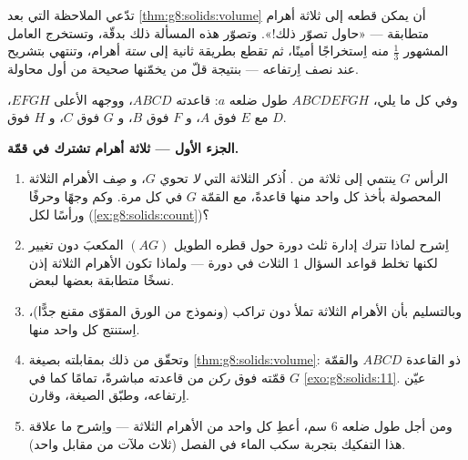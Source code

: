 \begin{problem}
\label{pb:g8:solids:1}
تدّعي الملاحظة التي بعد \cref{thm:g8:solids:volume} أن 
يمكن قطعه إلى ثلاثة أهرام متطابقة --- «حاول تصوّر
ذلك!». وتصوّر هذه المسألة ذلك بدقّة، وتستخرج العامل المشهور
$\frac13$ منه اِستخراجًا أمينًا، ثم تقطع  بطريقة ثانية إلى
\emph{ستة} أهرام، وتنتهي بتشريح  عند نصف
اِرتفاعه --- بنتيجة قلّ من يخمّنها صحيحة من أول محاولة.

وفي كل ما يلي، $ABCDEFGH$  طول ضلعه $a$: قاعدته $ABCD$، ووجهه
الأعلى $EFGH$، مع $E$ فوق $A$، و $F$ فوق $B$، و $G$ فوق $C$، و
$H$ فوق $D$.

\medskip
\noindent\textbf{الجزء الأول --- ثلاثة أهرام تشترك في قمّة.}
\begin{enumerate}
  \item الرأس $G$ ينتمي إلى ثلاثة  من . اُذكر
         الثلاثة التي \emph{لا} تحوي $G$، و
        صِف الأهرام الثلاثة المحصولة بأخذ كل واحد
        منها قاعدةً، مع القمّة $G$ في كل مرة. وكم وجهًا
        وحرفًا ورأسًا لكل 
        (\cref{ex:g8:solids:count})؟
  \item اِشرح لماذا تترك إدارة  ثلث دورة حول
        قطره الطويل $(AG)$ المكعبَ دون تغيير لكنها
        تخلط قواعد السؤال 1 الثلاث في دورة ---
        ولماذا تكون الأهرام الثلاثة إذن نسخًا
        متطابقة بعضها لبعض.
  \item وبالتسليم بأن الأهرام الثلاثة تملأ  دون
        تراكب (ونموذج من الورق المقوّى مقنع جدًّا)،
        اِستنتج  كل واحد منها.
  \item وتحقّق من ذلك بمقابلته بصيغة
        \cref{thm:g8:solids:volume}:  ذو القاعدة $ABCD$
        والقمّة $G$ قمّته فوق \emph{ركن}
        من قاعدته مباشرةً، تمامًا كما في \cref{exo:g8:solids:11}.
        عيّن اِرتفاعه، وطبّق الصيغة، وقارن.
  \item ومن أجل  طول ضلعه $6$ سم، أعطِ  كل واحد من
        الأهرام الثلاثة --- واِشرح ما علاقة هذا التفكيك
        بتجربة سكب الماء في الفصل
        (ثلاث ملآت من  مقابل  واحد).
\end{enumerate}


\end{problem}
